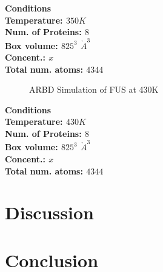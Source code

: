 \documentclass[12ptr]{article}
\begin{document}
\noindent \bf Conditions\\
\noindent Temperature: $350K$ \\ Num. of Proteins: $8$ \\ Box volume: $825 ^{3}$ $\mathring{A} ^{3}$ \\ Concent.: $x$ \\ Total num. atoms: $4344$
\begin{figure}[!ht]
    \centering
    \qquad
    \caption {ARBD Simulation of FUS at 430K}
    \label{fig:fus_430}
\end{figure}

\noindent \bf Conditions\\
\noindent Temperature: $430K$ \\ Num. of Proteins: $8$ \\ Box volume: $825 ^{3}$ $\mathring{A}^{3}$ \\ Concent.: $x$ \\ Total num. atoms: $4344$
 
 
\section{Discussion}
\newpage

\section{Conclusion}
\end{document}
